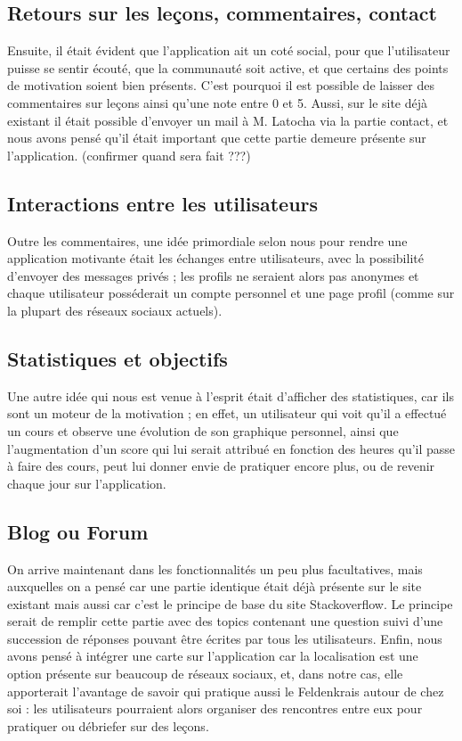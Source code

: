 \documentclass[pidr]{tnreport}
\begin{document}
\subsection{Retours sur les leçons, commentaires, contact}

Ensuite, il était évident que l’application ait un coté social, pour que l’utilisateur puisse se sentir écouté, que la communauté soit active, et que certains des points de motivation soient bien présents. C’est pourquoi il est possible de laisser des commentaires sur leçons ainsi qu’une note entre 0 et 5. Aussi, sur le site déjà existant il était possible d’envoyer un mail à M. Latocha via la partie contact, et nous avons pensé qu’il était important que cette partie demeure présente sur l’application.  (confirmer quand sera fait ???)

\subsection{Interactions entre les utilisateurs}

Outre les commentaires, une idée primordiale selon nous pour rendre une application motivante était les échanges entre utilisateurs, avec la possibilité d’envoyer des messages privés ; les profils ne seraient alors pas anonymes et chaque utilisateur posséderait un compte personnel et une page profil (comme sur la plupart  des réseaux sociaux actuels).

\subsection{Statistiques et objectifs}

Une autre idée qui nous est venue à l’esprit était d’afficher des statistiques, car ils sont un moteur de la motivation ; en effet, un utilisateur qui voit qu’il a effectué un cours et observe une évolution de son graphique personnel, ainsi que l’augmentation d’un score qui lui serait attribué en fonction des heures qu’il passe à faire des cours, peut lui donner envie de pratiquer encore plus, ou de revenir chaque jour sur l’application.

\subsection{Blog ou Forum}

On arrive maintenant dans les fonctionnalités un peu plus facultatives, mais auxquelles on a pensé car une partie identique était déjà présente sur le site existant mais aussi car c’est le principe de base du site Stackoverflow. Le principe serait de remplir cette partie avec des topics contenant une question suivi d’une succession de réponses pouvant être écrites par tous les utilisateurs. Enfin, nous avons pensé à intégrer une carte sur l’application car la localisation est une option présente sur beaucoup de réseaux sociaux, et, dans notre cas, elle apporterait l’avantage de savoir qui pratique aussi le Feldenkrais autour de chez soi : les utilisateurs pourraient alors organiser des rencontres entre eux pour pratiquer ou débriefer sur des leçons.
\end{document}
